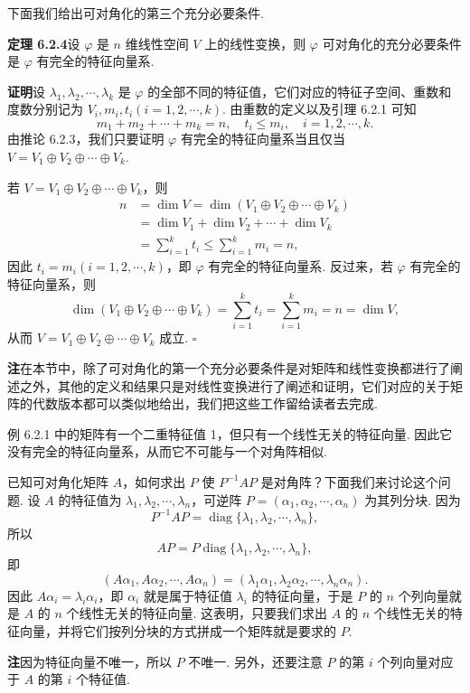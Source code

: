 \documentclass[UTF8, 12pt, fontset=fandol, oneside]{ctexart}
\begin{document}
下面我们给出可对角化的第三个充分必要条件.

\noindent\textbf{定理 6.2.4}\quad 设 $\varphi$ 是 $n$ 维线性空间 $V$ 上的线性变换，则 $\varphi$ 可对角化的充分必要条件是 $\varphi$ 有完全的特征向量系.

\noindent\textbf{证明}\quad 设 $\lambda_1,\lambda_2,\cdots,\lambda_k$ 是 $\varphi$ 的全部不同的特征值，它们对应的特征子空间、重数和度数分别记为 $V_i,m_i,t_i(i=1,2,\cdots,k)$. 由重数的定义以及引理 6.2.1 可知
\[
m_1+m_2+\cdots+m_k=n,\quad t_i\leq m_i,\quad i=1,2,\cdots,k.
\]
由推论 6.2.3，我们只要证明 $\varphi$ 有完全的特征向量系当且仅当 $V=V_1\oplus V_2\oplus\cdots\oplus V_k$.

若 $V=V_1\oplus V_2\oplus\cdots\oplus V_k$，则
\[
\begin{aligned}
n&=\dim V=\dim(V_1\oplus V_2\oplus\cdots\oplus V_k)\\
&=\dim V_1+\dim V_2+\cdots+\dim V_k\\
&=\sum_{i=1}^k t_i\leq \sum_{i=1}^k m_i=n,
\end{aligned}
\]
因此 $t_i=m_i(i=1,2,\cdots,k)$，即 $\varphi$ 有完全的特征向量系. 反过来，若 $\varphi$ 有完全的特征向量系，则
\[
\dim(V_1\oplus V_2\oplus\cdots\oplus V_k)=\sum_{i=1}^k t_i=\sum_{i=1}^k m_i=n=\dim V,
\]
从而 $V=V_1\oplus V_2\oplus\cdots\oplus V_k$ 成立. $\square$

\noindent\textbf{注}\quad 在本节中，除了可对角化的第一个充分必要条件是对矩阵和线性变换都进行了阐述之外，其他的定义和结果只是对线性变换进行了阐述和证明，它们对应的关于矩阵的代数版本都可以类似地给出，我们把这些工作留给读者去完成.

例 6.2.1 中的矩阵有一个二重特征值 1，但只有一个线性无关的特征向量. 因此它没有完全的特征向量系，从而它不可能与一个对角阵相似.

已知可对角化矩阵 $A$，如何求出 $P$ 使 $P^{-1}AP$ 是对角阵？下面我们来讨论这个问题. 设 $A$ 的特征值为 $\lambda_1,\lambda_2,\cdots,\lambda_n$，可逆阵 $P=(\alpha_1,\alpha_2,\cdots,\alpha_n)$ 为其列分块. 因为
\[
P^{-1}AP=\operatorname{diag}\{\lambda_1,\lambda_2,\cdots,\lambda_n\},
\]
所以
\[
AP=P\operatorname{diag}\{\lambda_1,\lambda_2,\cdots,\lambda_n\},
\]
即
\[
(A\alpha_1,A\alpha_2,\cdots,A\alpha_n)=(\lambda_1\alpha_1,\lambda_2\alpha_2,\cdots,\lambda_n\alpha_n).
\]
因此 $A\alpha_i=\lambda_i\alpha_i$，即 $\alpha_i$ 就是属于特征值 $\lambda_i$ 的特征向量，于是 $P$ 的 $n$ 个列向量就是 $A$ 的 $n$ 个线性无关的特征向量. 这表明，只要我们求出 $A$ 的 $n$ 个线性无关的特征向量，并将它们按列分块的方式拼成一个矩阵就是要求的 $P$.

\noindent\textbf{注}\quad 因为特征向量不唯一，所以 $P$ 不唯一. 另外，还要注意 $P$ 的第 $i$ 个列向量对应于 $A$ 的第 $i$ 个特征值.
\end{document}
